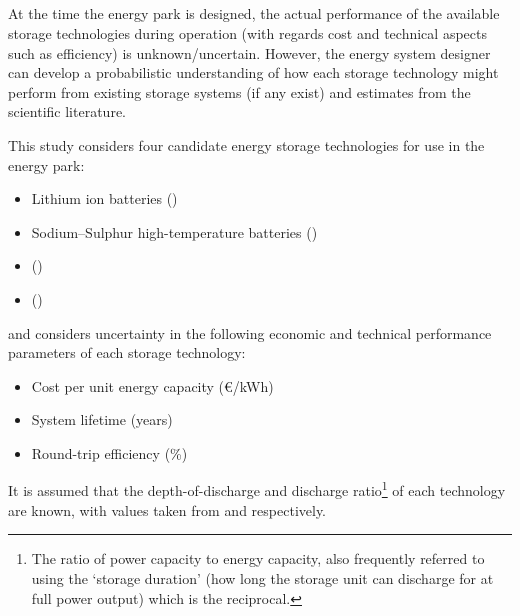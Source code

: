 \clearpage
\subsection{} \label{sec:parks-prob-storage}


At the time the energy park is designed, the actual performance of the available storage technologies during operation (with regards cost and technical aspects such as efficiency) is unknown/uncertain. However, the energy system designer can develop a probabilistic understanding of how each storage technology might perform from existing storage systems (if any exist) and estimates from the scientific literature.

This study considers four candidate energy storage technologies for use in the energy park:
\begin{itemize}
\itemsep0ex
    \item Lithium ion batteries ()
    \item Sodium--Sulphur high-temperature batteries ()
    \item {} ()
    \item {} ()
\end{itemize}
and considers uncertainty in the following economic and technical performance parameters of each storage technology:
\begin{itemize}
\itemsep0ex
    \item Cost per unit energy capacity (\euro/kWh)
    \item System lifetime (years)
    \item Round-trip efficiency (\%)
\end{itemize}
It is assumed that the depth-of-discharge and discharge ratio\footnote{The ratio of power capacity to energy capacity, also frequently referred to using the `storage duration' (how long the storage unit can discharge for at full power output) which is the reciprocal.} of each technology are known, with values taken from \citep{irena2017ElectricityStorageRenewables} and \citep{kebede2022ComprehensiveReviewStationary} respectively.\\


